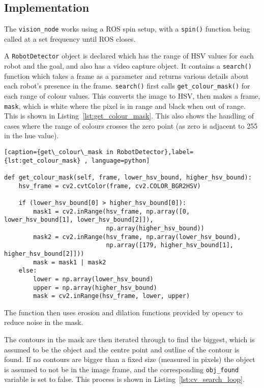\subsection{Implementation}\label{soft/cv/impl}
The \verb|vision_node| works using a ROS spin setup, with a \verb|spin()| function being
called at a set frequency until ROS closes.

A \verb|RobotDetector| object is declared which has the range of HSV values for each robot
and the goal, and also has a video capture object. It contains a \verb|search()| function which
takes a frame as a parameter and returns various details about each robot's presence in the
frame. \verb|search()| first calls \verb|get_colour_mask()| for each range of colour
values. This converts the image to HSV, then makes a frame, \verb|mask|, which is white where
the pixel is in range and black when out of range. This is shown in Listing~\ref{lst:get_colour_mask}.
This also shows the handling of cases where the range of colours
crosses the zero point (as zero is adjacent to 255 in the hue value).

\begin{lstlisting}[caption={get\_colour\_mask in RobotDetector},label={lst:get_colour_mask} , language=python]

def get_colour_mask(self, frame, lower_hsv_bound, higher_hsv_bound):
    hsv_frame = cv2.cvtColor(frame, cv2.COLOR_BGR2HSV)

    if (lower_hsv_bound[0] > higher_hsv_bound[0]):
        mask1 = cv2.inRange(hsv_frame, np.array([0, lower_hsv_bound[1], lower_hsv_bound[2]]),
                            np.array(higher_hsv_bound))
        mask2 = cv2.inRange(hsv_frame, np.array(lower_hsv_bound),
                            np.array([179, higher_hsv_bound[1], higher_hsv_bound[2]]))
        mask = mask1 | mask2
    else:
        lower = np.array(lower_hsv_bound)
        upper = np.array(higher_hsv_bound)
        mask = cv2.inRange(hsv_frame, lower, upper)
\end{lstlisting}

The function then uses erosion and dilation functions provided by opencv to reduce noise in the
mask.

The contours in the mask are then iterated through to find the biggest, which is assumed to be
the object and the centre point and outline of the contour is found. If no contours are bigger
than a fixed size (measured in pixels) the object is assumed to not be in the image frame, and
the corresponding \verb|obj_found| variable is set to false. This process is shown in Listing~\ref{lst:cv_search_loop}.

